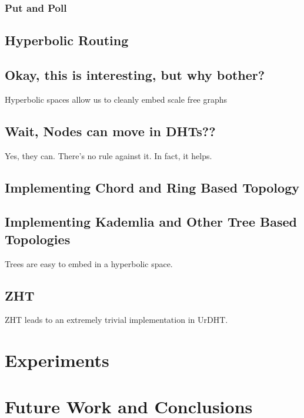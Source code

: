 \documentclass[11pt,conference]{IEEEtran}
\begin{document}
	\subsubsection{Put and Poll}
	\subsection{Hyperbolic Routing}
	\label{sec:hyper}
	
	\subsection{Okay, this is interesting, but why bother?}
	
	Hyperbolic spaces allow us to cleanly embed scale free graphs
	
	\subsection{Wait, Nodes can move in DHTs??}
	Yes, they can.  
	There's no rule against it. 
	In fact, it helps.
	
	\subsection{Implementing Chord and Ring Based Topology}
	
	
	\subsection{Implementing Kademlia and Other Tree Based Topologies}
	Trees are easy to embed in a hyperbolic space.
	\subsection{ZHT}
	ZHT leads to an extremely trivial implementation in UrDHT.
	
\section{Experiments}
\label{sec:experiments}

\section{Future Work and Conclusions}
\label{sec:future}



\end{document}
